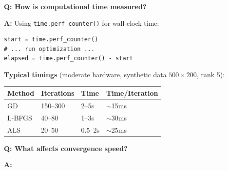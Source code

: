 \documentclass[11pt,oneside]{article}
\newcommand{\question}[1]{\textbf{Q: #1}}
\newcommand{\answer}{\textbf{A: }}
\begin{document}
\question{How is computational time measured?}

\answer Using \texttt{time.perf\_counter()} for wall-clock time:

\begin{lstlisting}
start = time.perf_counter()
# ... run optimization ...
elapsed = time.perf_counter() - start
\end{lstlisting}

\medskip

\textbf{Typical timings} (moderate hardware, synthetic data $500 \times 200$, rank 5):

\begin{table}[h]
\centering
\begin{tabular}{llll}
\toprule
\textbf{Method} & \textbf{Iterations} & \textbf{Time} & \textbf{Time/Iteration} \\
\midrule
GD & 150--300 & 2--5s & $\sim$15ms \\
L-BFGS & 40--80 & 1--3s & $\sim$30ms \\
ALS & 20--50 & 0.5--2s & $\sim$25ms \\
\bottomrule
\end{tabular}
\end{table}

\medskip

\question{What affects convergence speed?}

\answer
\end{document}

